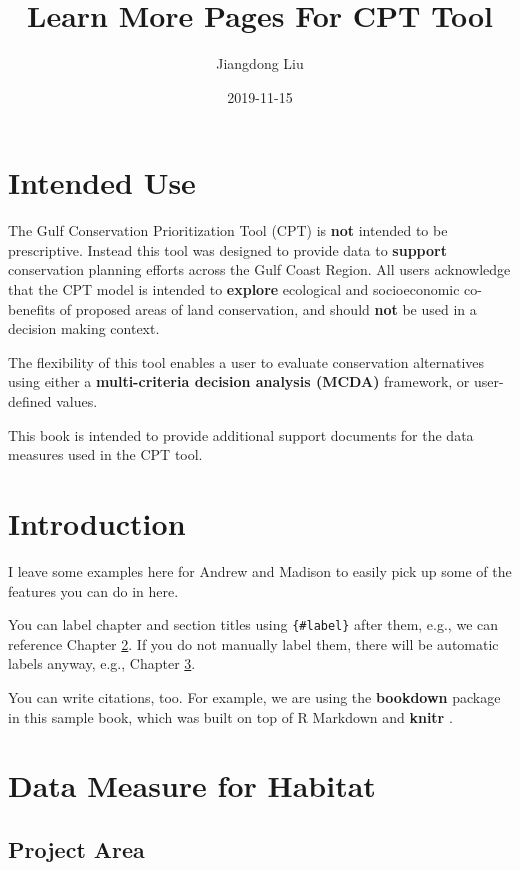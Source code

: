 \documentclass[]{book}
\title{Learn More Pages For CPT Tool}
\author{Jiangdong Liu}
\date{2019-11-15}
\begin{document}
\maketitle

{
\setcounter{tocdepth}{1}
\tableofcontents
}
\hypertarget{intended-use}{%
\chapter{Intended Use}\label{intended-use}}

The Gulf Conservation Prioritization Tool (CPT) is \textbf{not} intended to be prescriptive. Instead this tool was designed to provide data to \textbf{support} conservation planning efforts across the Gulf Coast Region. All users acknowledge that the CPT model is intended to \textbf{explore} ecological and socioeconomic co-benefits of proposed areas of land conservation, and should \textbf{not} be used in a decision making context.

The flexibility of this tool enables a user to evaluate conservation alternatives using either a \textbf{multi-criteria decision analysis (MCDA)} framework, or user-defined values.

This book is intended to provide additional support documents for the data measures used in the CPT tool.

\hypertarget{intro}{%
\chapter{Introduction}\label{intro}}

I leave some examples here for Andrew and Madison to easily pick up some of the features you can do in here.

You can label chapter and section titles using \texttt{\{\#label\}} after them, e.g., we can reference Chapter \ref{intro}. If you do not manually label them, there will be automatic labels anyway, e.g., Chapter \ref{habitat}.

You can write citations, too. For example, we are using the \textbf{bookdown} package \citep{chuck2019} in this sample book, which was built on top of R Markdown and \textbf{knitr} \citep{xie2015}.

\hypertarget{habitat}{%
\chapter{Data Measure for Habitat}\label{habitat}}

\hypertarget{project-area}{%
\section{Project Area}\label{project-area}}
\end{document}

